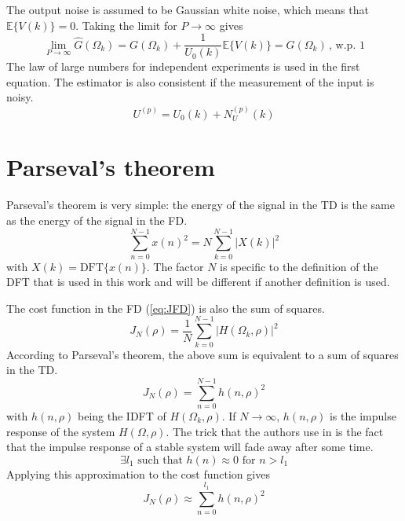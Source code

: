 The output noise is assumed to be Gaussian white noise, which means that $\mathbb{E}\{V(k)\}=0$. Taking the limit for $P \rightarrow \infty$ gives
\begin{equation*}
    \lim_{P \rightarrow \infty} \hat G(\Omega_k) = G(\Omega_k) + \frac{1}{U_0(k)} \mathbb{E}\{V(k)\} = G(\Omega_k) \,,\, \text{w.p. } 1
\end{equation*}
The law of large numbers for independent experiments is used in the first equation. The estimator is also consistent if the measurement of the input is noisy.
\begin{equation*}
    U^{(p)} = U_0(k) + N_U^{(p)}(k)
\end{equation*}

\newpage
\section{Parseval's theorem}
\label{sec:parseval}
Parseval's theorem is very simple: the energy of the signal in the TD is the same as the energy of the signal in the FD.
\begin{equation}
    \sum_{n=0}^{N-1} x(n)^2 = N \sum_{k=0}^{N-1} |X(k)|^2
    \label{eq:parseval_theorem}
\end{equation}
with $X(k) = \text{DFT}\{x(n)\}$. The factor $N$ is specific to the definition of the DFT that is used in this work and will be different if another definition is used.

The cost function in the FD (\ref{eq:JFD}) is also the sum of squares.
\begin{equation*}
    J_N(\rho) = \frac{1}{N} \sum_{k=0}^{N-1} |H(\Omega_k,\rho)|^2
\end{equation*}
According to Parseval's theorem, the above sum is equivalent to a sum of squares in the TD.
\begin{equation*}
    J_N(\rho) = \sum_{n=0}^{N-1} h(n,\rho)^2
\end{equation*}
with $h(n,\rho)$ being the IDFT of $H(\Omega_k,\rho)$. If $N \rightarrow \infty$, $h(n,\rho)$ is the impulse response of the system $H(\Omega,\rho)$. The trick that the authors use in \cite{Data-driven_model_reference_control} is the fact that the impulse response of a stable system will fade away after some time.
\begin{equation*}
    \exists l_1 \text{ such that } h(n) \approx 0 \text{ for } n > l_1
\end{equation*}
Applying this approximation to the cost function gives
\begin{equation}
    J_N(\rho) \approx  \sum_{n=0}^{l_1} h(n,\rho)^2
    \label{eq:Japprox_impulse_response}
\end{equation}


